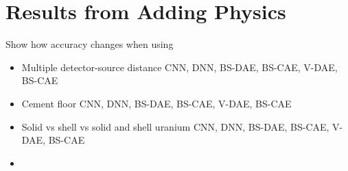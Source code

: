 \section{Results from Adding Physics}

Show how accuracy changes when using
\begin{itemize}
    \item Multiple detector-source distance
    \subitem CNN, DNN, BS-DAE, BS-CAE, V-DAE, BS-CAE
    \item Cement floor
    \subitem CNN, DNN, BS-DAE, BS-CAE, V-DAE, BS-CAE
    \item Solid vs shell vs solid and shell uranium
    \subitem CNN, DNN, BS-DAE, BS-CAE, V-DAE, BS-CAE
    \item 
\end{itemize}







